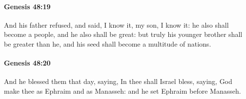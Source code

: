 		\paragraph{Genesis 48:19} %
			\label{GENESIS-48-19}

			And his father refused, and said, I know it, my son, I know it: he also shall become a people, and he also shall be great: but truly his younger brother shall be greater than he, and his seed shall become a multitude of nations.


		\paragraph{Genesis 48:20} %
			\label{GENESIS-48-20}

			And he blessed them that day, saying, In thee shall Israel bless, saying, God make thee as Ephraim and as Manasseh: and he set Ephraim before Manasseh.

